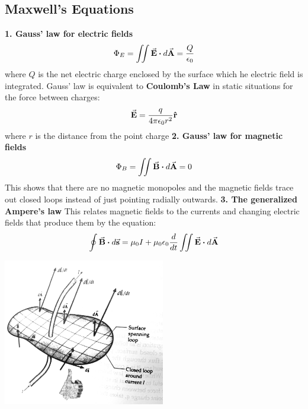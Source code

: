     \subsection*{Maxwell's Equations}
        \textbf{1. Gauss' law for electric fields}
            \begin{equation*}
                \Phi_E = \iint \va{E} \vdot d\va{A} = \frac{Q}{\epsilon_0}
            \end{equation*}
            where $Q$ is the net electric charge enclosed by the surface which he electric field is integrated. Gauss' law is equivalent to \textbf{Coulomb's Law} in static situations for the force between charges:
            \begin{equation*}
                \va{E} = \frac{q}{4\pi\epsilon_0r^2}\vu{r}
            \end{equation*}
            where $r$ is the distance from the point charge
            \newline
        \textbf{2. Gauss' law for magnetic fields}
            \begin{equation*}
                \Phi_B = \iint \va{B} \vdot d\va{A} = 0
            \end{equation*}
            This shows that there are no magnetic monopoles and the magnetic fields trace out closed loops instead of just pointing radially outwards.
            \newline
        \textbf{3. The generalized Ampere's law}
            \newline
            This relates magnetic fields to the currents and changing electric fields that produce them by the equation:
            \begin{equation*}
                \oint \va{B} \vdot d\va{s} = \mu_0I + \mu_0\epsilon_0\frac{d}{dt}\iint \va{E} \vdot d\va{A}
            \end{equation*}
            \begin{center}
                \includegraphics[width=200pt]{ampereslaw.jpg}
            \end{center}
